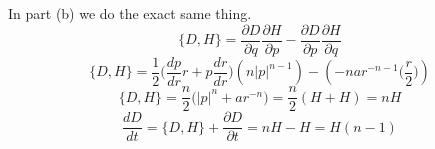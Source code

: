 \documentclass[11pt,a4paper]{report}
\begin{document}
In part (b) we do the exact same thing.
\begin{equation}
\{D, H\}=\dfrac{\partial D}{\partial q}\dfrac{\partial H}{\partial p}-\dfrac{\partial D}{\partial p}\dfrac{\partial H}{\partial q}
\end{equation}
\begin{equation}
\{D, H\}= \dfrac{1}{2}\Big(\dfrac{dp}{dr}r+p\dfrac{dr}{dr}\Big)(n|p|^{n-1})-(-nar^{-n-1}\Big(\dfrac{r}{2}\Big))
\end{equation}
\begin{equation}
\{D, H\} = \dfrac{n}{2}\Big(|p|^{n}+ar^{-n}\Big)=\dfrac{n}{2}(H+H)=nH
\end{equation}
\begin{equation}
\dfrac{dD}{dt}=\{D, H\}+\dfrac{\partial D}{\partial t} = nH-H=H(n-1)
\end{equation}
\end{document}
